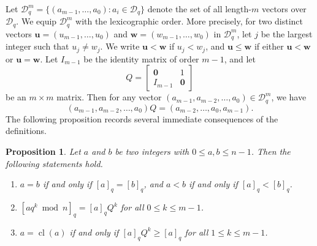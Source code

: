 \documentclass[journal,onecolumn]{IEEEtran}
\newtheorem{proposition}{Proposition}
\newcommand{\cl}{\operatorname{cl}}
\begin{document}
Let $
\mathcal{D}_q^m = \{(a_{m-1}, \ldots, a_0) : a_i \in \mathcal{D}_q \}
$ 
denote the set of all length-$m$ vectors over $\mathcal{D}_q$. We equip $\mathcal{D}_q^m$ with the lexicographic order. More precisely, for two distinct vectors
$
\mathbf{u}=(u_{m-1},\ldots,u_0) $ and $ \mathbf{w}=(w_{m-1},\ldots,w_0)$
in $\mathcal{D}_q^m$, let $j$ be the largest integer  such that $u_j \neq w_j$. We write $\mathbf{u}<\mathbf{w}$ if $u_j<w_j$, and $\mathbf{u}\leq\mathbf{w}$ if either $\mathbf{u}<\mathbf{w}$ or $\mathbf{u}=\mathbf{w}$.
 Let $I_{m-1}$ be the identity matrix of order $m-1$, and let 
\begin{equation*}
   Q = \begin{bmatrix}
        \mathbf{0} & 1 \\
        I_{m-1} & \mathbf{0}
    \end{bmatrix}
\end{equation*}
be an $m\times m$ matrix.
Then for any vector $(a_{m-1},a_{m-2},\ldots,a_0) \in \mathcal{D}_q^m$, we have
\begin{equation*}
    (a_{m-1},a_{m-2},\ldots,a_0)Q = (a_{m-2},\ldots,a_{0},a_{m-1}).   
\end{equation*}
The following proposition records several immediate consequences of the
definitions.
\begin{proposition}\label{properties}
Let $a$ and $b$ be two integers with $0\leq a,b\leq n-1$. Then the following
statements hold.
\begin{enumerate}
    \item  $a=b$ if and only if $[a]_q=[b]_q$, and $a<b$ if and
    only if $[a]_q<[b]_q$.
    \item 
    $
    [a q^k\bmod n]_q=[a]_qQ^k
$  for all $0\leq k\leq m-1$.
    \item  $a=\cl(a)$  if and only if
    $
    [a]_qQ^k\geq  [a]_q
   $ 
    for all $1\leq k\leq m-1$.
\end{enumerate}
\end{proposition}
\end{document}
